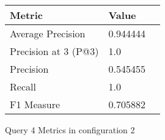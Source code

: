 \begin{figure}[H]
\begin{center}
\begin{tabular}{lll}
\toprule
{}                      Metric &         Value \\
\midrule
     Average Precision &  0.944444 \\
  Precision at 3 (P@3) &       1.0 \\
             Precision &  0.545455 \\
                Recall &       1.0 \\
            F1 Measure &  0.705882 \\
\bottomrule
\end{tabular}
\end{center}
\caption{Query 4 Metrics in configuration 2}
\label{fig:query_4_metrics_config_2}
\end{figure}